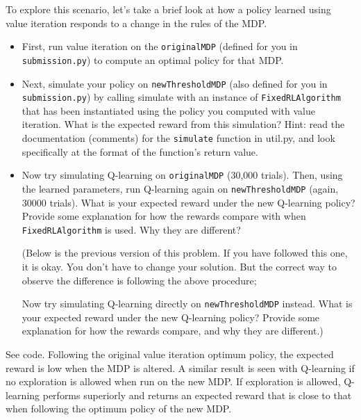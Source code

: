 \documentclass[10pt]{article}
\begin{document}
\begin{enumerate}[label=(\alph*)]
	To explore this scenario, let's take a brief look at how a policy learned using value iteration responds to a change in the rules of the MDP.

	\begin{itemize}
		\item First, run value iteration on the \texttt{originalMDP} (defined for you in \texttt{submission.py}) to compute an optimal policy for that MDP.
		\item Next, simulate your policy on \texttt{newThresholdMDP} (also defined for you in \texttt{submission.py}) by calling simulate with an instance of \texttt{FixedRLAlgorithm} that has been instantiated using the policy you computed with value iteration. What is the expected reward from this simulation? Hint: read the documentation (comments) for the \texttt{simulate} function in util.py, and look specifically at the format of the function's return value.
		\item Now try simulating Q-learning on \texttt{originalMDP} (30,000 trials). Then, using the learned parameters, run Q-learning again on \texttt{newThresholdMDP} (again, 30000 trials). What is your expected reward under the new Q-learning policy? Provide some explanation for how the rewards compare with when \texttt{FixedRLAlgorithm} is used. Why they are different?
		
		(Below is the previous version of this problem. If you have followed this one, it is okay. You don't have to change your solution. But the correct way to observe the difference is following the above procedure;

		Now try simulating Q-learning directly on \texttt{newThresholdMDP} instead. What is your expected reward under the new Q-learning policy? Provide some explanation for how the rewards compare, and why they are different.) 
	\end{itemize}
	
	See code. Following the original value iteration optimum policy, the expected reward is low when the MDP is altered. A similar result is seen with Q-learning if no exploration is allowed when run on the new MDP. If exploration is allowed, Q-learning performs superiorly and returns an expected reward that is close to that when following the optimum policy of the new MDP.
		
\end{enumerate}
\fi
\end{document}
